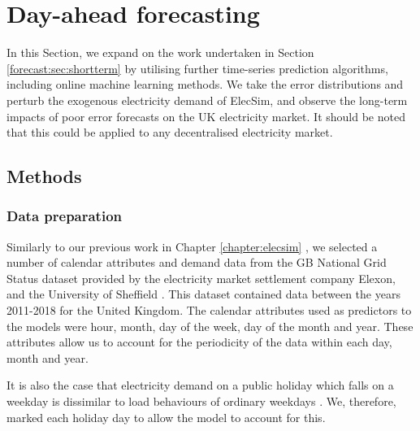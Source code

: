 \section{Day-ahead forecasting}
\label{forecast:sec:longterm}

In this Section, we expand on the work undertaken in Section \ref{forecast:sec:shortterm} by utilising further time-series prediction algorithms, including online machine learning methods. We take the error distributions and perturb the exogenous electricity demand of ElecSim, and observe the long-term impacts of poor error forecasts on the UK electricity market. It should be noted that this could be applied to any decentralised electricity market. 


\subsection{Methods}
\label{sec:methods}


\subsubsection{Data preparation}

Similarly to our previous work in Chapter \ref{chapter:elecsim} \cite{Kell2018a}, we selected a number of calendar attributes and demand data from the GB National Grid Status dataset provided by the electricity market settlement company Elexon, and the University of Sheffield \cite{gbnationalgridstatus2019}. This dataset contained data between the years 2011-2018 for the United Kingdom. The calendar attributes used as predictors to the models were hour, month, day of the week, day of the month and year. These attributes allow us to account for the periodicity of the data within each day, month and year.

It is also the case that electricity demand on a public holiday which falls on a weekday is dissimilar to load behaviours of ordinary weekdays \cite{Kim2000}. We, therefore, marked each holiday day to allow the model to account for this.

